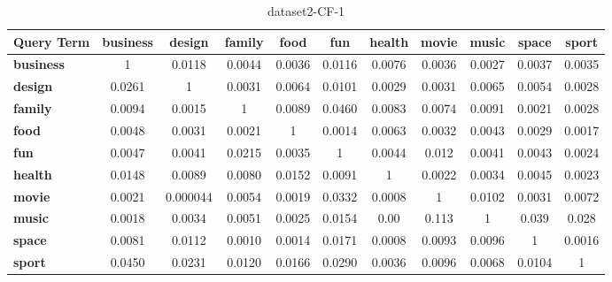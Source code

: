 \documentclass{sig-alternate}
\begin{document}
\begin{table}[!ht]
\centering
\resizebox{14cm}{!} 
{
	\begin{tabular}{|l|c|c|c|c|c|c|c|c|c|c|}
	\hline
\textbf{Query Term }& \textbf{business} &\textbf{ design} & \textbf{family} & \textbf{food} &\textbf{ fun} & \textbf{health} & \textbf{movie} & \textbf{music} & \textbf{space} & \textbf{sport}\\
	\hline
\textbf{business}	 & 1 & 0.0118 & 0.0044 & 0.0036 & 0.0116 & 0.0076 & 0.0036 & 0.0027 & 0.0037 & 0.0035\\ 
	 	\hline
\textbf{design }& 0.0261 & 1 & 0.0031 & 0.0064 & 0.0101 & 0.0029 & 0.0031 & 0.0065 & 0.0054 & 0.0028
	 	\\ 
	 	\hline
	 	
\textbf{family} & 0.0094  & 0.0015 & 1 & 0.0089 & 0.0460 & 0.0083 & 0.0074 & 0.0091 & 0.0021 & 0.0028 
	 	 \\ 
	 	\hline
\textbf{food} & 0.0048 & 0.0031 & 0.0021 & 1 & 0.0014 & 0.0063 & 0.0032 & 0.0043 & 0.0029 & 0.0017 
	 	\\ 
	 	\hline
\textbf{fun} & 0.0047 & 0.0041 & 0.0215 & 0.0035	& 1 & 0.0044 & 0.012 & 0.0041 & 0.0043 & 0.0024 
	 	\\ 
	 	\hline
\textbf{	 health}	 & 0.0148 & 0.0089 & 0.0080 & 0.0152 & 0.0091 & 1 & 0.0022 & 0.0034 & 0.0045 & 0.0023
	 	\\ 
	 	\hline
\textbf{movie} & 0.0021 & 0.000044 & 0.0054 & 0.0019 & 0.0332 & 0.0008 & 1 & 0.0102 & 0.0031 & 0.0072 
	 	 \\ 
	 	\hline
\textbf{music} & 0.0018 & 0.0034 & 0.0051 & 0.0025 & 0.0154 & 0.00 & 0.113 & 1 & 0.039 & 0.028 
	 	\\ 
	 	\hline
\textbf{space }& 0.0081 & 0.0112 & 0.0010 & 0.0014 & 0.0171 & 0.0008 & 0.0093 & 0.0096 & 1 & 0.0016 
	 	\\ 
	 	\hline
\textbf{sport} & 0.0450 & 0.0231 & 0.0120 & 0.0166 & 0.0290 & 0.0036 & 0.0096 & 0.0068 & 0.0104 & 1 \\
	\hline
	\end{tabular}
}
\caption{dataset2-CF-1}\label{cf6}
\end{table}


\end{document}
